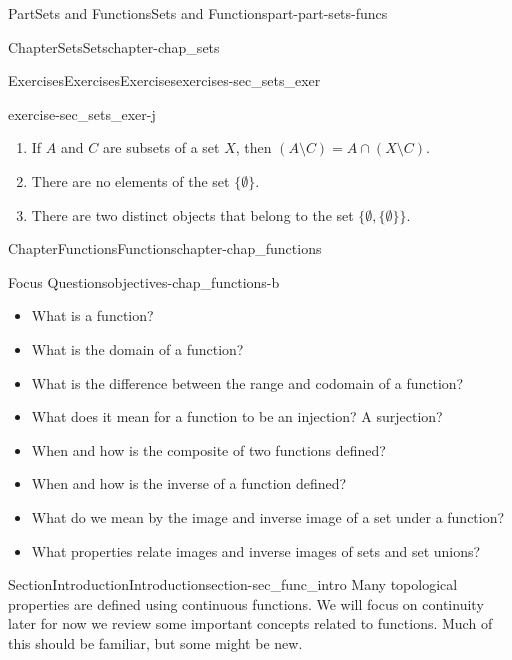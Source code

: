 \documentclass[oneside,10pt,]{book}
\numberwithin{equation}{chapter}
\begin{document}
\begin{partptx}{Part}{Sets and Functions}{}{Sets and Functions}{}{}{part-part-sets-funcs}
\begin{chapterptx}{Chapter}{Sets}{}{Sets}{}{}{chapter-chap_sets}
\begin{exercises-section}{Exercises}{Exercises}{}{Exercises}{}{}{exercises-sec_sets_exer}
\begin{divisionexercise}{10}{}{}{exercise-sec_sets_exer-j}
\begin{enumerate}[font=\bfseries,label=(\alph*),ref=\alph*]
\item{}If \(A\) and \(C\) are subsets of a set \(X\), then \((A \setminus C) = A \cap (X \setminus C)\).%
\item{}There are no elements of the set \(\{\emptyset\}\).%
\item{}There are two distinct objects that belong to the set \(\{\emptyset, \{\emptyset\}\}\).%
\end{enumerate}%
\end{divisionexercise}%
\end{exercises-section}
\end{chapterptx}
%
\typeout{************************************************}
\typeout{************************************************}
%
\begin{chapterptx}{Chapter}{Functions}{}{Functions}{}{}{chapter-chap_functions}
\renewcommand*{\chaptername}{Chapter}
\begin{objectives}{Focus Questions}{objectives-chap_functions-b}
%
\begin{itemize}[label=\textbullet]
\item{}What is a function?%
\item{}What is the domain of a function?%
\item{}What is the difference between the range and codomain of a function?%
\item{}What does it mean for a function to be an injection? A surjection?%
\item{}When and how is the composite of two functions defined?%
\item{}When and how is the inverse of a function defined?%
\item{}What do we mean by the image and inverse image of a set under a function?%
\item{}What properties relate images and inverse images of sets and set unions?%
\end{itemize}
\end{objectives}
%
%
\typeout{************************************************}
\typeout{************************************************}
%
\begin{sectionptx}{Section}{Introduction}{}{Introduction}{}{}{section-sec_func_intro}
Many topological properties are defined using continuous functions. We will focus on continuity later \textemdash{} for now we review some important concepts related to functions. Much of this should be familiar, but some might be new.%
\par

\end{sectionptx}
\end{chapterptx}
\end{partptx}
\end{document}
